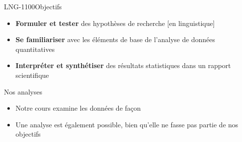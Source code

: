 \documentclass[xcolor=dvipsnames, onlymath, 10pt, aspectratio=169, handout]{beamer}
\begin{document}


\begin{frame}{LNG-1100}{Objectifs}

	\begin{itemize}

		\item \textbf{Formuler et tester} des hypothèses de recherche [en linguistique]

		      \pause

		\item \textbf{Se familiariser} avec les éléments de base de l’analyse de données quantitatives

		      \pause

		\item \textbf{Interpréter et synthétiser} des résultats statistiques dans un rapport scientifique
	\end{itemize}

	\begin{importanttitle}{Nos analyses}
		\begin{itemize}
			\item Notre cours examine les données de façon 
			\item Une analyse  est également possible, bien qu'elle ne fasse pas partie de nos objectifs

		\end{itemize}
	\end{importanttitle}



\end{frame}
\end{document}
